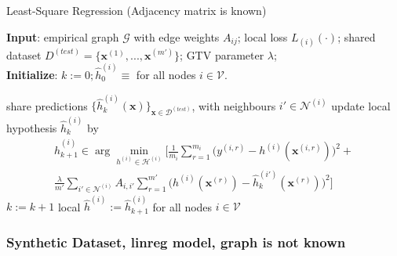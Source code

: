 \documentclass{article}
\newcommand{\graph}{\mathcal{G}}
\begin{document}
\newpage
\begin{algorithm}[htbp]
	\caption{Least-Square Regression (Adjacency matrix is known)}
	\label{alg_X_param}
	{\bf Input}: empirical graph $\graph$ with edge weights $A_{ij}$; 
	local loss $L_{(i)}{(\cdot)}$; shared dataset $D^{(test)} = \{\mathbf{x}^{(1)}, ..., \mathbf{x}^{(m')}\}$; GTV parameter $\lambda$; \\
	{\bf Initialize}: $k:=0; \widehat{h}_{0}^{(i)} \!\equiv\!$ for all nodes $i \in \mathcal{V}$.
	\begin{algorithmic}[1]
		\State share predictions $\{\widehat{h}_{k}^{(i)}(\mathbf{x})\}_{\mathbf{x} \in \mathcal{D}^(test)}$, 
		with neighbours $i' \in \mathcal{N}^{(i)}$ 
		\State update local hypothesis $\widehat{h}_{k}^{(i)}$ by
            \begin{multline*}
            \widehat{h}_{k+1}^{(i)} \in  \arg \min_{h^{(i)} \in \mathcal{H}^{(i)}} 
            \biggl[ \frac{1}{m_i}  \sum_{r=1}^{m_i} \biggl( y^{(i,r)} - h^{(i)}(\mathbf{x}^{(i,r)})  \biggr)^2 + \\
            \frac{\lambda}{m'} \sum_{i' \in \mathcal{N}^{(i)}}A_{i,i'}\sum_{r=1}^{m'} \biggl( h^{(i)}(\mathbf{x}^{(r)}) - \widehat{h}_{k}^{(i')}(\mathbf{x}^{(r)}) \biggr)^2 \biggr]
            \end{multline*}
		\EndFor
		\State $k := k+1$
		\EndWhile
			  \Ensure local $\widehat{h}^{(i)} := \widehat{h}_{k+1}^{(i)}$ for all nodes $i \in \mathcal{V}$
	\end{algorithmic}
\end{algorithm}

\newpage
\subsubsection{Synthetic Dataset, linreg model, graph is not known}
\end{document}
